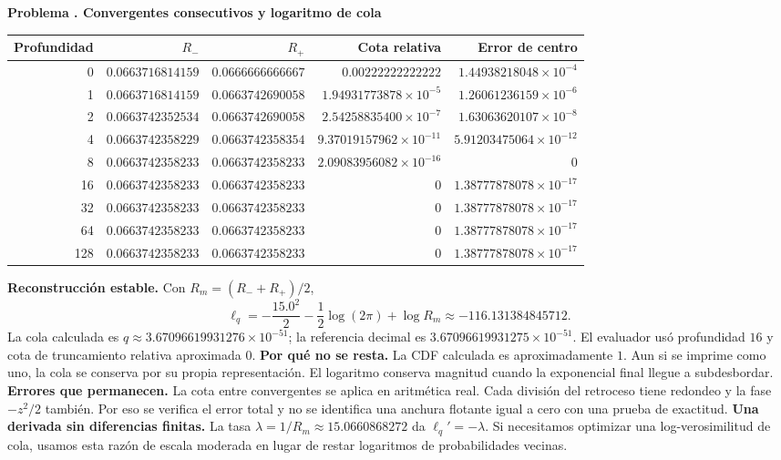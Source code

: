 \documentclass[11pt,a4paper]{article}
\theoremstyle{definition}
\newcounter{problema}
\newenvironment{resuelto}[1]{\refstepcounter{problema}\par\medskip\Needspace{6\baselineskip}\textbf{Problema \theproblema. #1}\par}{\par\medskip}
\begin{document}
\begin{resuelto}{Convergentes consecutivos y logaritmo de cola}
\begin{center}\small\begin{tabular}{rrrrr}
\toprule
Profundidad&$R_-$&$R_+$&Cota relativa&Error de centro\\
\midrule
0&$0.0663716814159$&$0.0666666666667$&$0.00222222222222$&$1.44938218048\times10^{-4}$\\
1&$0.0663716814159$&$0.0663742690058$&$1.94931773878\times10^{-5}$&$1.26061236159\times10^{-6}$\\
2&$0.0663742352534$&$0.0663742690058$&$2.54258835400\times10^{-7}$&$1.63063620107\times10^{-8}$\\
4&$0.0663742358229$&$0.0663742358354$&$9.37019157962\times10^{-11}$&$5.91203475064\times10^{-12}$\\
8&$0.0663742358233$&$0.0663742358233$&$2.09083956082\times10^{-16}$&$0$\\
16&$0.0663742358233$&$0.0663742358233$&$0$&$1.38777878078\times10^{-17}$\\
32&$0.0663742358233$&$0.0663742358233$&$0$&$1.38777878078\times10^{-17}$\\
64&$0.0663742358233$&$0.0663742358233$&$0$&$1.38777878078\times10^{-17}$\\
128&$0.0663742358233$&$0.0663742358233$&$0$&$1.38777878078\times10^{-17}$\\
\bottomrule\end{tabular}\end{center}
\textbf{Reconstrucción estable.} Con $R_m=(R_-+R_+)/2$,
\[
\ell_q=-\frac{15.0^2}{2}-\frac12\log(2\pi)+\log R_m\approx-116.131384845712.
\]
La cola calculada es $q\approx3.67096619931276\times10^{-51}$; la referencia decimal es $3.67096619931275\times10^{-51}$. El evaluador usó profundidad $16$ y cota de truncamiento relativa aproximada $0$.
\textbf{Por qué no se resta.} La CDF calculada es aproximadamente $1$. Aun si se imprime como uno, la cola se conserva por su propia representación. El logaritmo conserva magnitud cuando la exponencial final llegue a subdesbordar.
\textbf{Errores que permanecen.} La cota entre convergentes se aplica en aritmética real. Cada división del retroceso tiene redondeo y la fase $-z^2/2$ también. Por eso se verifica el error total y no se identifica una anchura flotante igual a cero con una prueba de exactitud.
\textbf{Una derivada sin diferencias finitas.} La tasa $\lambda=1/R_m\approx15.0660868272$ da $\ell_q\prime=-\lambda$. Si necesitamos optimizar una log-verosimilitud de cola, usamos esta razón de escala moderada en lugar de restar logaritmos de probabilidades vecinas.
\end{resuelto}
\end{document}
